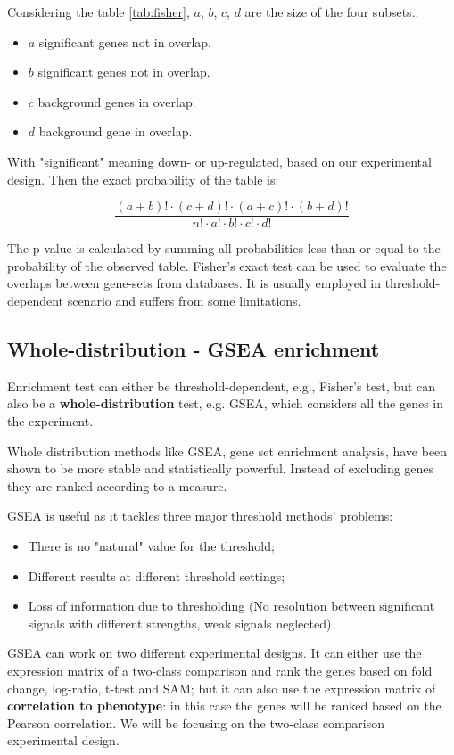 		Considering the table \ref{tab:fisher}, $a$, $b$, $c$, $d$ are the size of the four subsets.:

			\begin{itemize}
				\item $a$ significant genes not in overlap.
				\item $b$ significant genes not in overlap.
				\item $c$ background genes in overlap.
				\item $d$ background gene in overlap.
			\end{itemize}
		
		With "significant" meaning down- or up-regulated, based on our experimental design.
		Then the exact probability of the table is:

		$$\frac{(a+b)!\cdot(c+d)!\cdot(a+c)!\cdot(b+d)!}{n!\cdot a!\cdot b!\cdot c!\cdot d!}$$

		The p-value is calculated by summing all probabilities less than or equal to the probability of the observed table.
		Fisher's exact test can be used to evaluate the overlaps between gene-sets from databases.
		It is usually employed in threshold-dependent scenario and suffers from some limitations.

	\subsection{Whole-distribution - GSEA enrichment}
	Enrichment test can either be threshold-dependent, e.g., Fisher's test, but can also  be a \textbf{whole-distribution} test, e.g. GSEA, which considers all the genes in the experiment.
	
	Whole distribution methods like GSEA, gene set enrichment analysis, have been shown to be more stable and statistically powerful.
	Instead of excluding genes they are ranked according to a measure.
	
	GSEA is useful as it tackles three major threshold methods' problems:
	\begin{itemize}
	\item There is no "natural" value for the threshold;
	\item Different results at different threshold settings;
	\item Loss of information due to thresholding (No resolution between significant signals with different strengths, weak signals neglected)
	\end{itemize}
	
	GSEA can work on two different experimental designs.
	It can either use the expression matrix of a two-class comparison and rank the genes based on fold change, log-ratio, t-test and SAM; but it can also use the expression matrix of \textbf{correlation to phenotype}: in this case the genes will be ranked based on the Pearson correlation.
	We will be focusing on the two-class comparison experimental design.

